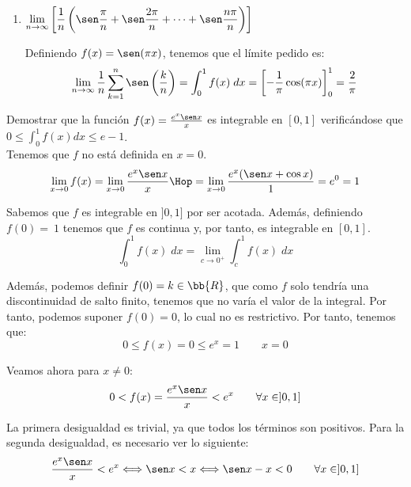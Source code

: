 \begin{ejercicio}
\begin{enumerate}
    \item $\displaystyle \lim_{n\to\infty} \left[ \frac{1}{n} \left(\sen \frac{\pi}{n} +\sen \frac{2\pi}{n} +\dots+\sen \frac{n\pi}{n} \right)\right]$
    
    Definiendo $f(x)=\sen (\pi x)$, tenemos que el límite pedido es:
    \begin{equation*}
        \lim_{n\to\infty} \frac{1}{n} \sum_{k=1}^n \sen \left(\frac{k}{n}\right) = \int_0^1 f(x)\;dx = \left[-\frac{1}{\pi}\cos (\pi x)\right]_0^1 = \frac{2}{\pi}
    \end{equation*}
\end{enumerate}
\end{ejercicio}

\begin{ejercicio}
    Demostrar que la función $f(x)=\frac{e^x\sen x}{x}$ es integrable en $[0,1]$ verificándose que $0\leq \int_0^1 f(x)dx \leq e-1$.\\

    Tenemos que $f$ no está definida en $x=0$. 
    \begin{equation*}
        \lim_{x\to 0}f(x) = \lim_{x\to 0}\frac{e^x\sen x}{x}
        \Hop
        =\lim_{x\to 0}\frac{e^x(\sen x + \cos x)}{1} = e^0 = 1
    \end{equation*}

    Sabemos que $f$ es integrable en $]0,1]$ por ser acotada. Además, definiendo $f(0)=~1$ tenemos que $f$ es continua y, por tanto, es integrable en $[0,1]$.
    \begin{equation*}
        \int_0^1 f(x)\;dx = \lim_{c\to 0^+}\int_c^1 f(x)\;dx
    \end{equation*}
    
    Además, podemos definir $f(0)=k\in \bb{R}$, que como $f$ solo tendría una discontinuidad de salto finito, tenemos que no varía el valor de la integral. Por tanto, podemos suponer $f(0)=0$, lo cual no es restrictivo. Por tanto, tenemos que:
    \begin{equation*}
        0\leq f(x)=0 \leq e^x=1 \qquad x=0
    \end{equation*}

    Veamos ahora para $x\neq 0$:
    \begin{equation*}
        0 < f(x)=\frac{e^x\sen x}{x} < e^x \qquad \forall x\in ]0,1]
    \end{equation*}

    La primera desigualdad es trivial, ya que todos los términos son positivos. Para la segunda desigualdad, es necesario ver lo siguiente:
    \begin{equation*}
        \frac{e^x\sen x}{x} < e^x \Longleftrightarrow \sen x < x \Longleftrightarrow \sen x -x < 0 \qquad \forall x\in ]0,1]
    \end{equation*}


\end{ejercicio}
